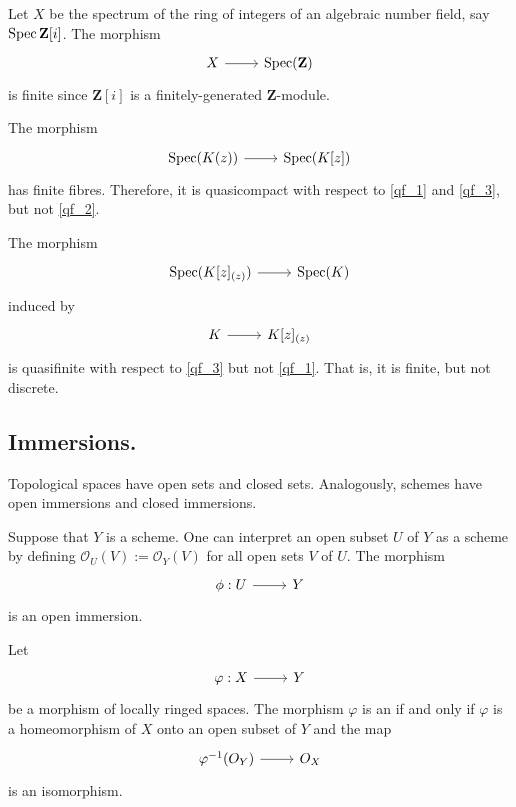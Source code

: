 \documentclass [11 pt, oneside] {article}
\begin{document}
\begin{example}[ ]\label{}\text{}
Let $X$ be the spectrum of the ring of integers of an algebraic number field, say $\operatorname{Spec} \mathbf{Z}[i]$. The morphism 
\[
\begin{tikzcd}
X\ar[r]& \Spec(\Z)
\end{tikzcd}
\]  
is finite since $\mathbf{Z}[i]$ is a finitely-generated $\mathbf{Z}$-module. 
\end{example}

\begin{example}[ ]\label{}\text{}
The morphism 
\[
\begin{tikzcd}
\Spec(K(z))\ar[r]&\Spec(K[z])
\end{tikzcd}
\]  
has finite fibres. Therefore, it is quasicompact with respect to \cref{qf_1} and \cref{qf_3}, but not \cref{qf_2}.
\end{example}

\begin{example}[ ]\label{}\text{}
The morphism 
\[
\begin{tikzcd}
\Spec( K[z]_{(z)} )\ar[r]& \Spec(K)
\end{tikzcd}
\]  
induced by 
\[
\begin{tikzcd}
K\ar[r]& K[z]_{(z) }
\end{tikzcd}
\]
is quasifinite with respect to \cref{qf_3} but not \cref{qf_1}. That is, it is finite, but not discrete.
\end{example}

\subsection{Immersions.}
Topological spaces have open sets and closed sets. Analogously, schemes have open immersions and closed immersions. 

Suppose that $Y$ is a scheme. One can interpret an open subset $U$ of $Y$ as a scheme by defining $\mathscr{O}_U (V):=\mathscr{O}_Y(V)$ for all open sets $V$ of $U$. The morphism 
\[
\begin{tikzcd}
\phi:U\ar[r]&Y
\end{tikzcd}
\]  
is an open immersion.

\begin{definition}[ ]\label{}\text{}
Let 
\[
\begin{tikzcd}
\varphi :X\ar[r]& Y
\end{tikzcd}
\]  
be a morphism of locally ringed spaces. The morphism $\varphi$ is an  if and only if $\varphi$ is a homeomorphism of $X$ onto an open subset of $Y$ and the map 
\[
\begin{tikzcd}
\varphi^{-1}(\mathscr{O}_Y)\ar[r]& \mathscr{O}_X
\end{tikzcd}
\]  
is an isomorphism.
\end{definition}
\end{document}
